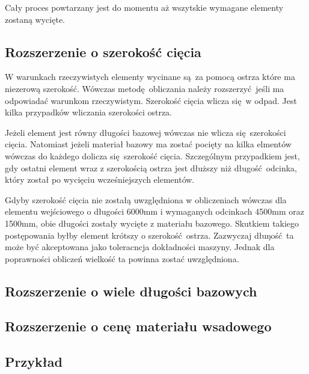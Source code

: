 Cały proces powtarzany jest do momentu aż wszytskie wymagane elementy zostaną wycięte.
\subsection{Rozszerzenie o szerokość cięcia}
W warunkach rzeczywistych elementy wycinane są za pomocą ostrza które ma niezerową szerokość. Wówczas metodę obliczania należy rozszerzyć jeśli ma odpowiadać warunkom rzeczywistym. Szerokość cięcia wlicza się w odpad. Jest kilka przypadków wliczania szerokości ostrza.

Jeżeli element jest równy długości bazowej wówczas nie wlicza się szerokości cięcia. Natomiast jeżeli materiał bazowy ma zostać pocięty na kilka elmentów wówczas do każdego dolicza się szerokość cięcia. Szczególnym przypadkiem jest, gdy ostatni element wraz z szerokością ostrza jest dłuższy niż długość odcinka, który został po wycięciu wcześniejszych elementów.

Gdyby szerokość cięcia nie zostałą uwzględniona w obliczeniach wówczas dla elementu wejściowego o długości 6000mm i wymaganych odcinkach 4500mm oraz 1500mm, obie długości zostały wycięte z materiału bazowego. Skutkiem takiego postępowania byłby element krótszy o szerokość ostrza. Zazwyczaj dłuŋość ta może być akceptowana jako toleracncja dokładności maszyny. Jednak dla poprawności obliczeń wielkość ta powinna zostać uwzględniona.

\subsection{Rozszerzenie o wiele długości bazowych}
\subsection{Rozszerzenie o cenę materiału wsadowego}
\subsection{Przykład}
